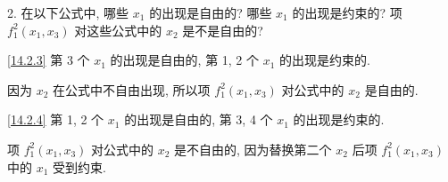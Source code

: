 \documentclass[boxes]{homework}
\begin{document}
\setlength\abovedisplayskip{.125em}
\setlength\belowdisplayskip{.125em}
\begin{problem}
2. 在以下公式中, 哪些 $x_1$ 的出现是自由的? 哪些 $x_1$ 的出现是约束的? 项 $f_1^2(x_1, x_3)$ 对这些公式中的 $x_2$ 是不是自由的?
\end{problem}

\begin{solution}
\ref{14.2.3} 第 3 个 $x_1$ 的出现是自由的, 第 1, 2 个 $x_1$ 的出现是约束的.

因为 $x_2$ 在公式中不自由出现, 所以项 $f_1^2(x_1, x_3)$ 对公式中的 $x_2$ 是自由的.

\ref{14.2.4} 第 1, 2 个 $x_1$ 的出现是自由的, 第 3, 4 个 $x_1$ 的出现是约束的.

项 $f_1^2(x_1, x_3)$ 对公式中的 $x_2$ 是不自由的, 因为替换第二个 $x_2$ 后项 $f_1^2(x_1, x_3)$ 中的 $x_1$ 受到约束.
\end{solution}
\end{document}
